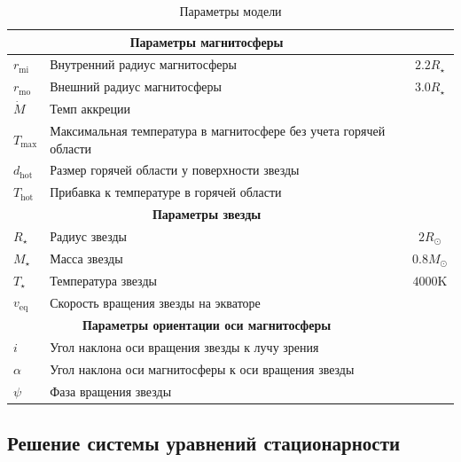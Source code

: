 \documentclass[12pt]{article}
\begin{document}
\begin{table}[hb]
\centering
\begin{tabular}[c]{|l l c|}
	\multicolumn{2}{c}{\textbf{Параметры магнитосферы}} \\
	\hline
	$r_\text{mi}$ & Внутренний радиус магнитосферы & $2.2 R_\star$\\
	\hline
	$r_\text{mo}$ & Внешний радиус магнитосферы & $3.0 R_\star$\\
	\hline
	$\dot{M}$ & Темп аккреции & \\
	\hline
	$T_\text{max}$ & Максимальная температура в магнитосфере без учета горячей области & \\
	\hline
	$d_\text{hot}$ & Размер горячей области у поверхности звезды & \\
	\hline
	$T_\text{hot}$ & Прибавка к температуре в горячей области & \\
	\hline
	\multicolumn{2}{c}{\textbf{Параметры звезды}} \\
	\hline
	$R_\star $ & Радиус звезды & $2 R_\odot$ \\
	\hline
	$M_\star $ & Масса звезды & $0.8 M_\odot$ \\
	\hline
	$T_\star $ & Температура звезды & $4000\text{K} $ \\
	\hline
	$v_\text{eq}$ & Скорость вращения звезды на экваторе & \\
	\hline
	\multicolumn{2}{c}{\textbf{Параметры ориентации оси магнитосферы}} \\
	\hline
	$i$ & Угол наклона оси вращения звезды к лучу зрения & \\
	\hline
	$\alpha$ & Угол наклона оси магнитосферы к оси вращения звезды & \\
	\hline
	$\psi$ & Фаза вращения звезды & \\
	\hline
\end{tabular}
\caption{Параметры модели}
\label{tab:par}
\end{table}

\subsection{Решение системы уравнений стационарности}
\end{document}

